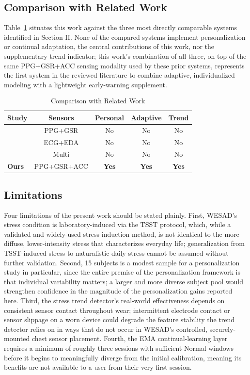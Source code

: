 \documentclass[conference]{IEEEtran}
\begin{document}
\subsection{Comparison with Related Work}
Table~\ref{tab_comparison2} situates this work against the
three most directly comparable systems identified in Section
II. None of the compared systems implement personalization or
continual adaptation, the central contributions of this work,
nor the supplementary trend indicator; this work's
combination of all three, on top of the same PPG+GSR+ACC
sensing modality used by these prior systems, represents the
first system in the reviewed literature to combine adaptive,
individualized modeling with a lightweight early-warning
supplement.

\begin{table}[htbp]
\caption{Comparison with Related Work}
\begin{center}
\begin{tabular}{|l|c|c|c|c|}
\hline
\textbf{Study} &
\textbf{Sensors} &
\textbf{Personal} &
\textbf{Adaptive} &
\textbf{Trend} \\
\hline
\cite{b10} &
PPG+GSR & No & No & No \\
\cite{b11} &
ECG+EDA & No & No & No \\
\cite{b6} &
Multi & No & No & No \\
\textbf{Ours} &
PPG+GSR+ACC &
\textbf{Yes} &
\textbf{Yes} &
\textbf{Yes} \\
\hline
\end{tabular}
\label{tab_comparison2}
\end{center}
\end{table}

\subsection{Limitations}
Four limitations of the present work should be stated plainly.
First, WESAD's stress condition is laboratory-induced via the
TSST protocol, which, while a validated and widely-used stress
induction method, is not identical to the more diffuse,
lower-intensity stress that characterizes everyday life;
generalization from TSST-induced stress to naturalistic daily
stress cannot be assumed without further validation. Second,
15 subjects is a modest sample for a personalization study in
particular, since the entire premise of the personalization
framework is that individual variability matters; a larger and more diverse
subject pool would strengthen confidence in the magnitude of
the personalization gains reported here. Third, the stress
trend detector's real-world effectiveness depends on
consistent sensor contact throughout wear; intermittent
electrode contact or sensor slippage on a worn device could
degrade the feature stability the trend detector relies on in
ways that do not occur in WESAD's controlled, securely-mounted
chest sensor placement. Fourth, the EMA continual-learning
layer requires a minimum of roughly three sessions with
sufficient Normal windows before it begins to meaningfully
diverge from the initial calibration, meaning its benefits are
not available to a user from their very first session.
\end{document}
